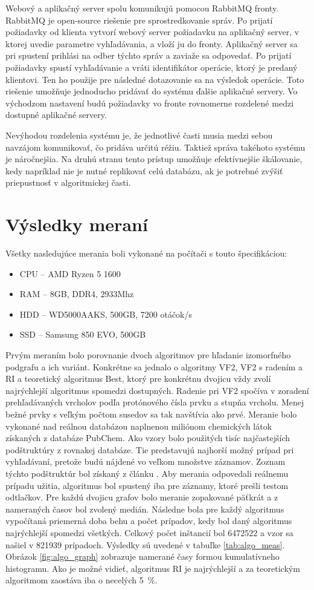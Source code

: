 \documentclass[slovak]{ExcelAtFIT} %
\begin{document}
Webový a aplikačný server spolu komunikujú pomocou RabbitMQ fronty. RabbitMQ je open-source riešenie pre sprostredkovanie správ. Po prijatí požiadavky od klienta vytvorí webový server požiadavku na aplikačný server, v ktorej uvedie parametre vyhľadávania, a vloží ju do fronty. Aplikačný server sa pri spustení prihlási na odber týchto správ a zaviaže sa odpovedať. Po prijatí požiadavky spustí vyhľadávanie a vráti identifikátor operácie, ktorý je predaný klientovi. Ten ho použije pre následné dotazovanie sa na výsledok operácie. Toto riešenie umožňuje jednoducho pridávať do systému ďalšie aplikačné servery. Vo východzom nastavení budú požiadavky vo fronte rovnomerne rozdelené medzi dostupné aplikačné servery.

Nevýhodou rozdelenia systému je, že jednotlivé časti musia medzi sebou navzájom komunikovať, čo pridáva určitú réžiu. Taktiež správa takéhoto systému je náročnejšia. Na druhú stranu tento prístup umožňuje efektívnejšie škálovanie, kedy napríklad nie je nutné replikovať celú databázu, ak je potrebné zvýšiť priepustnosť v algoritmickej časti.  


\section{Výsledky meraní}
\label{sec:Results}
Všetky nasledujúce merania boli vykonané na počítači s touto špecifikáciou:
\begin{itemize}
	\item CPU -- AMD Ryzen 5 1600
	\item RAM -- 8GB, DDR4, 2933Mhz
	\item HDD -- WD5000AAKS, 500GB, 7200 otáčok/s
	\item SSD -- Samsung 850 EVO, 500GB
\end{itemize}
Prvým meraním bolo porovnanie dvoch algoritmov pre hľadanie izomorfného podgrafu a ich variánt. Konkrétne sa jednalo o algoritmy VF2, VF2 s radením a RI a teoretický algoritmus Best, ktorý pre konkrétnu dvojicu vždy zvolí najrýchlejší algoritmus spomedzi dostupných. Radenie pri VF2 spočíva v zoradení pre\-hľa\-dá\-va\-ný\-ch vrcholov podľa protónového čísla prvku a stupňa vrcholu. Menej bežné prvky s veľkým počtom susedov sa tak navštívia ako prvé. Meranie bolo vykonané nad reálnou databázou naplnenou miliónom chemických látok získaných z databáze PubChem. Ako vzory bolo použitých tisíc najčastejších podštruktúry z rovnakej databáze. Tie predstavujú najhorší možný prípad pri vyhľadávaní, pretože budú nájdené vo veľkom množstve záznamov. Zoznam týchto podštruktúr bol získaný z článku \cite{mol_cloud}. Aby merania odpovedali reálnemu prípadu užitia, algoritmus bol spustený iba pre záznamy, ktoré prešli testom odtlačkov. Pre každú dvojicu grafov bolo meranie zopakované päťkrát a z nameraných časov bol zvolený medián. Následne bola pre každý algoritmus vypočítaná priemerná doba behu a počet prípadov, kedy bol daný algoritmus najrýchlejší spomedzi všetkých. Celkový počet inštancií bol 6472522 a vzor sa našiel v 821939 prípadoch. Výsledky sú uvedené v tabuľke \ref{tab:algo_meas}. Obrázok \ref{fig:algo_graph} zobrazuje namerané časy formou kumulatívneho histogramu. Ako je možné vidieť, algoritmus RI je najrýchlejší a za teoretickým algoritmom zaostáva iba o necelých \SI{5}{\percent}.
\end{document}
